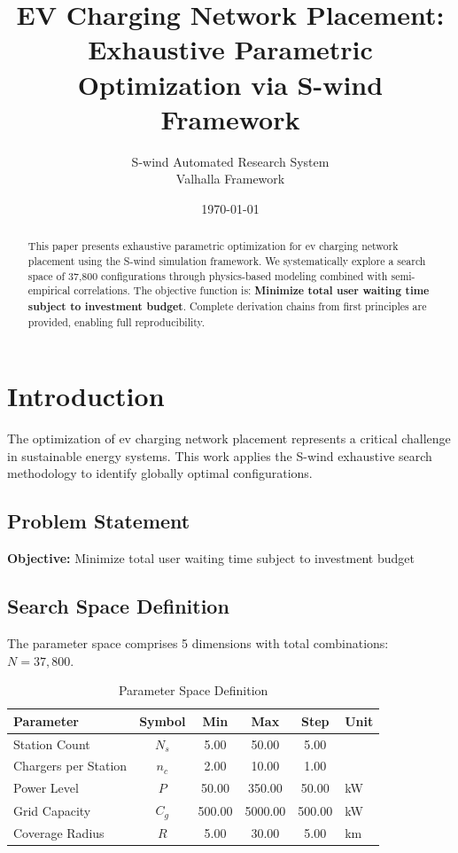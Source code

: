 \documentclass[11pt,twocolumn]{article}
\title{EV Charging Network Placement: \\Exhaustive Parametric Optimization via S-wind Framework}
\author{S-wind Automated Research System\\Valhalla Framework}
\date{\today}
\begin{document}
\maketitle

\begin{abstract}
This paper presents exhaustive parametric optimization for ev charging network placement using the S-wind simulation framework.
We systematically explore a search space of 37,800 configurations through physics-based modeling
combined with semi-empirical correlations. The objective function is: \textbf{Minimize total user waiting time subject to investment budget}.
Complete derivation chains from first principles are provided, enabling full reproducibility.
\end{abstract}

\section{Introduction}
The optimization of ev charging network placement represents a critical challenge in sustainable energy systems.
This work applies the S-wind exhaustive search methodology to identify globally optimal configurations.

\subsection{Problem Statement}
\textbf{Objective:} Minimize total user waiting time subject to investment budget

\subsection{Search Space Definition}
The parameter space comprises 5 dimensions with total combinations: $N = 37,800$.

\begin{table}[h]
\centering
\caption{Parameter Space Definition}
\begin{tabular}{@{}lccccl@{}}
\toprule
Parameter & Symbol & Min & Max & Step & Unit \\
\midrule
Station Count & $N_s$ & 5.00 & 50.00 & 5.00 &  \\
Chargers per Station & $n_c$ & 2.00 & 10.00 & 1.00 &  \\
Power Level & $P$ & 50.00 & 350.00 & 50.00 & kW \\
Grid Capacity & $C_g$ & 500.00 & 5000.00 & 500.00 & kW \\
Coverage Radius & $R$ & 5.00 & 30.00 & 5.00 & km \\
\bottomrule
\end{tabular}
\end{table}
\end{document}
